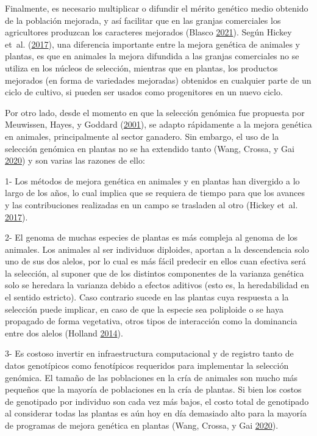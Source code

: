 \documentclass[11pt,spanish,a4paper,oneside,]{book} %
\begin{document}
Finalmente, es necesario multiplicar o difundir el mérito genético medio obtenido de la población mejorada, y así facilitar que en las granjas comerciales los agricultores produzcan los caracteres mejorados (Blasco \protect\hyperlink{ref-cite:21}{2021}). Según Hickey et~al. (\protect\hyperlink{ref-cite:44}{2017}), una diferencia importante entre la mejora genética de animales y plantas, es que en animales la mejora difundida a las granjas comerciales no se utiliza en los núcleos de selección, mientras que en plantas, los productos mejorados (en forma de variedades mejoradas) obtenidos en cualquier parte de un ciclo de cultivo, si pueden ser usados como progenitores en un nuevo ciclo.

Por otro lado, desde el momento en que la selección genómica fue propuesta por Meuwissen, Hayes, y Goddard (\protect\hyperlink{ref-cite:8}{2001}), se adapto rápidamente a la mejora genética en animales, principalmente al sector ganadero. Sin embargo, el uso de la selección genómica en plantas no se ha extendido tanto (Wang, Crossa, y Gai \protect\hyperlink{ref-cite:46}{2020}) y son varias las razones de ello:

1- Los métodos de mejora genética en animales y en plantas han divergido a lo largo de los años, lo cual implica que se requiera de tiempo para que los avances y las contribuciones realizadas en un campo se trasladen al otro (Hickey et~al. \protect\hyperlink{ref-cite:44}{2017}).

2- El genoma de muchas especies de plantas es más compleja al genoma de los animales. Los animales al ser individuos diploides, aportan a la descendencia solo uno de sus dos alelos, por lo cual es más fácil predecir en ellos cuan efectiva será la selección, al suponer que de los distintos componentes de la varianza genética solo se heredara la varianza debido a efectos aditivos (esto es, la heredabilidad en el sentido estricto). Caso contrario sucede en las plantas cuya respuesta a la selección puede implicar, en caso de que la especie sea poliploide o se haya propagado de forma vegetativa, otros tipos de interacción como la dominancia entre dos alelos (Holland \protect\hyperlink{ref-cite:43}{2014}).

3- Es costoso invertir en infraestructura computacional y de registro tanto de datos genotípicos como fenotípicos requeridos para implementar la selección genómica. El tamaño de las poblaciones en la cría de animales son mucho más pequeños que la mayoría de poblaciones en la cría de plantas. Si bien los costos de genotipado por individuo son cada vez más bajos, el costo total de genotipado al considerar todas las plantas es aún hoy en día demasiado alto para la mayoría de programas de mejora genética en plantas (Wang, Crossa, y Gai \protect\hyperlink{ref-cite:46}{2020}).
\end{document}
